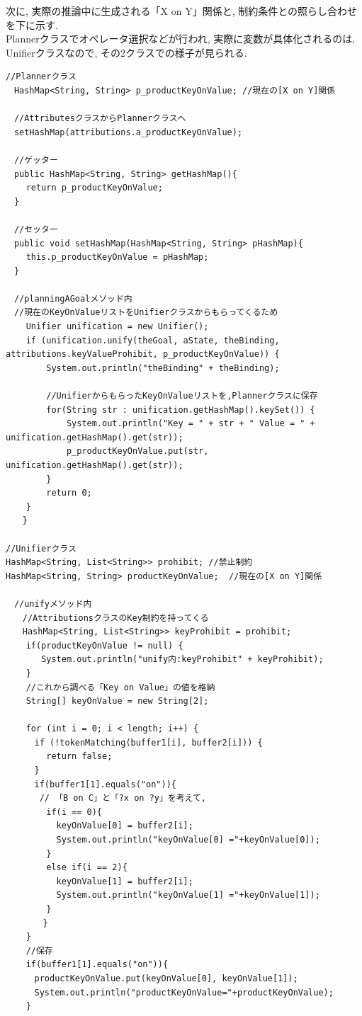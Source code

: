 \documentclass[uplatex,12pt]{jsarticle}
\begin{document}
次に, 実際の推論中に生成される「X on Y」関係と, 制約条件との照らし合わせを下に示す. \\
Plannerクラスでオペレータ選択などが行われ, 実際に変数が具体化されるのは, Unifierクラスなので, その2クラスでの様子が見られる.
\begin{lstlisting}[caption=禁止制約をHashMapに管理, label=src:No1]
//Plannerクラス
　HashMap<String, String> p_productKeyOnValue; //現在の[X on Y]関係

　//AttributesクラスからPlannerクラスへ
　setHashMap(attributions.a_productKeyOnValue);

　//ゲッター
　public HashMap<String, String> getHashMap(){
	return p_productKeyOnValue;
　}
	
　//セッター
　public void setHashMap(HashMap<String, String> pHashMap){
	this.p_productKeyOnValue = pHashMap;
　}

　//planningAGoalメソッド内
　//現在のKeyOnValueリストをUnifierクラスからもらってくるため
	Unifier unification = new Unifier();
	if (unification.unify(theGoal, aState, theBinding, attributions.keyValueProhibit, p_productKeyOnValue)) {
		System.out.println("theBinding" + theBinding);

		//UnifierからもらったKeyOnValueリストを,Plannerクラスに保存
		for(String str : unification.getHashMap().keySet()) {
			System.out.println("Key = " + str + " Value = " + unification.getHashMap().get(str));
			p_productKeyOnValue.put(str, unification.getHashMap().get(str));
		}
		return 0;
	}
　　}

//Unifierクラス
HashMap<String, List<String>> prohibit;	//禁止制約
HashMap<String, String> productKeyOnValue;  //現在の[X on Y]関係

　//unifyメソッド内
　　//AttributionsクラスのKey制約を持ってくる
　　HashMap<String, List<String>> keyProhibit = prohibit;
	if(productKeyOnValue != null) {
	   System.out.println("unify内:keyProhibit" + keyProhibit);
	}
	//これから調べる「Key on Value」の値を格納
	String[] keyOnValue = new String[2];

	for (int i = 0; i < length; i++) {
	　if (!tokenMatching(buffer1[i], buffer2[i])) {
		return false;
	　}
	　if(buffer1[1].equals("on")){
	　 // 「B on C」と「?x on ?y」を考えて,
		if(i == 0){
		  keyOnValue[0] = buffer2[i];
		  System.out.println("keyOnValue[0] ="+keyOnValue[0]);
		}
		else if(i == 2){
		  keyOnValue[1] = buffer2[i];
		  System.out.println("keyOnValue[1] ="+keyOnValue[1]);
		}
	　　}
	}
	//保存
	if(buffer1[1].equals("on")){
	　productKeyOnValue.put(keyOnValue[0], keyOnValue[1]);
	　System.out.println("productKeyOnValue="+productKeyOnValue);
	}


\end{lstlisting}
\end{document}
